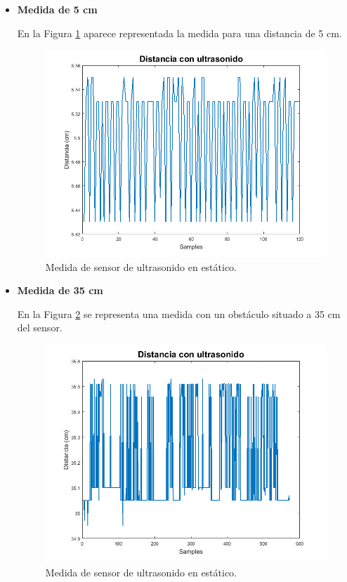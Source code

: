 \begin{itemize}
	\item \textbf{Medida de 5 cm}
	
	En la Figura \ref{fig:ultra5} aparece representada la medida para una distancia de 5 cm. 
	
	\begin{figure}[H]
		\centering
		\includegraphics[width=17 cm,height=11 cm]{./graphics/5}
		\caption{Medida de sensor de ultrasonido en estático.} \label{fig:ultra5}
		
	\end{figure}
	\item \textbf{Medida de 35 cm}
	
	En la Figura \ref{fig:ultra} se representa una medida con un obstáculo situado a 35 cm del sensor. 
	
	\begin{figure}[H]
		\centering
		\includegraphics[width=16 cm,height=8.5 cm]{./graphics/aa}
		\caption{Medida de sensor de ultrasonido en estático.} \label{fig:ultra}
		

\end{figure}
\end{itemize}
